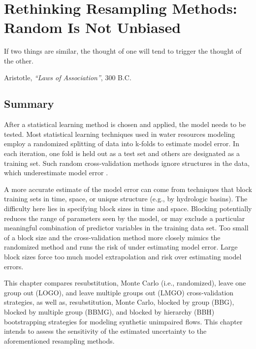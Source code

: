 \chapter[Rethinking Resampling Methods]{Rethinking Resampling Methods: Random Is Not Unbiased} \label{ch4:resampling}
\setlength{\epigraphwidth}{4.5in}
\epigraph{If two things are similar, the thought of one will tend to trigger the thought of the other.}{Aristotle, \textit{``Laws of Association''}, 300 B.C.}

\section*{Summary}
After a statistical learning method is chosen and applied, the model needs to be tested. Most statistical learning techniques used in water resources modeling employ a randomized splitting of data into k-folds to estimate model error. In each iteration, one fold is held out as a test set and others are designated as a training set. Such random cross-validation methods ignore structures in the data, which underestimate model error  \cite{roberts2017cross}. %

A more accurate estimate of the model error can come from techniques that block training sets in time, space, or unique structure (e.g., by hydrologic basins). The difficulty here lies in specifying block sizes in time and space. Blocking potentially reduces the range of parameters seen by the model, or may exclude a particular meaningful combination of predictor variables in the training data set. Too small of a block size and the cross-validation method more closely mimics the randomized method and runs the risk of under estimating model error. Large block sizes force too much model extrapolation and risk over estimating model errors. 

This chapter compares resubstitution, Monte Carlo (i.e., randomized), leave one group out (LOGO), and leave multiple groups out (LMGO) cross-validation strategies, as well as, resubstitution, Monte Carlo, blocked by group (BBG), blocked by multiple group (BBMG), and blocked by hierarchy (BBH) bootstrapping strategies for modeling synthetic unimpaired flows. This chapter intends to assess the sensitivity of the estimated uncertainty to the aforementioned resampling methods. 

